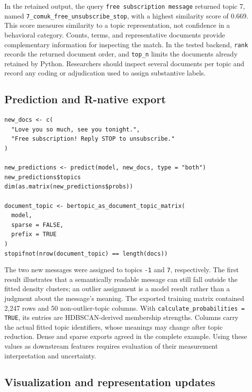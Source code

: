 \documentclass[12pt]{article}
\newcommand{\code}[1]{\texttt{#1}}
\newcommand{\fcode}[1]{\nolinkurl{#1}}
\begin{document}
In the retained output, the query \code{free subscription message} returned topic 7, named \fcode{7_comuk_free_unsubscribe_stop}, with a highest similarity score of 0.669. This score measures similarity to a topic representation, not confidence in a behavioral category. Counts, terms, and representative documents provide complementary information for inspecting the match. In the tested backend, \code{rank} records the returned document order, and \fcode{top_n} limits the documents already retained by Python. Researchers should inspect several documents per topic and record any coding or adjudication used to assign substantive labels.

\subsection{Prediction and R-native export}

\begin{lstlisting}[caption={Transforming new documents and exporting training-corpus output.}]
new_docs <- c(
  "Love you so much, see you tonight.",
  "Free subscription! Reply STOP to unsubscribe."
)

new_predictions <- predict(model, new_docs, type = "both")
new_predictions$topics
dim(as.matrix(new_predictions$probs))

document_topic <- bertopic_as_document_topic_matrix(
  model,
  sparse = FALSE,
  prefix = TRUE
)
stopifnot(nrow(document_topic) == length(docs))
\end{lstlisting}

The two new messages were assigned to topics \code{-1} and \code{7}, respectively. The first result illustrates that a semantically readable message can still fall outside the fitted density clusters; an outlier assignment is a model result rather than a judgment about the message's meaning. The exported training matrix contained 2,247 rows and 50 non-outlier-topic columns. With \fcode{calculate_probabilities = TRUE}, its entries are HDBSCAN-derived membership strengths. Columns carry the actual fitted topic identifiers, whose meanings may change after topic reduction. Dense and sparse exports agreed in the complete example. Using these values as downstream features requires evaluation of their measurement interpretation and uncertainty.

\subsection{Visualization and representation updates}
\end{document}
